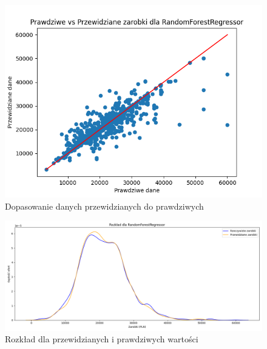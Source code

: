 \documentclass[a4paper]{article}
\begin{document}
\begin{figure}[H]
    \centering
    \includegraphics[width=\textwidth]{../analysis/plots/wyniki/0.8&0.2/RandomForestRegressor/scatter.png}
    \caption{Dopasowanie danych przewidzianych do prawdziwych}
\end{figure}

\begin{figure}[H]
    \centering
    \includegraphics[width=\textwidth]{../analysis/plots/wyniki/0.8&0.2/RandomForestRegressor/salary_dist.png}
    \caption{Rozkład dla przewidzianych i prawdziwych wartości}
\end{figure}
\end{document}
